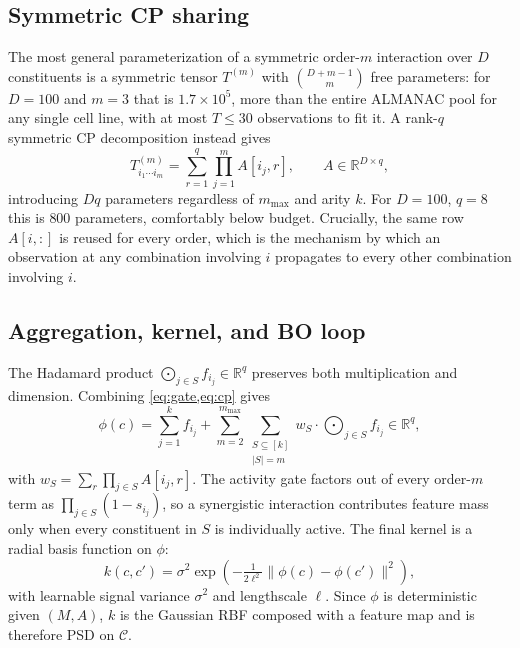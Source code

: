 \documentclass{article}
\begin{document}
\subsection{Symmetric CP sharing}

The most general parameterization of a symmetric order-$m$ interaction over
$D$ constituents is a symmetric tensor $T^{(m)}$ with
$\binom{D+m-1}{m}$ free parameters: for $D = 100$ and $m = 3$ that is
$1.7 \times 10^5$, more than the entire ALMANAC pool for any single cell
line, with at most $T \le 30$ observations to fit it. A rank-$q$ symmetric CP
decomposition instead gives
\begin{equation}
T^{(m)}_{i_1 \cdots i_m} = \sum_{r=1}^{q} \prod_{j=1}^{m} A[i_j, r],
\qquad A \in \mathbb{R}^{D \times q},
\label{eq:cp}
\end{equation}
introducing $Dq$ parameters regardless of $m_{\max}$ and arity $k$. For
$D = 100$, $q = 8$ this is $800$ parameters, comfortably below budget.
Crucially, the same row $A[i,:]$ is reused for every order, which is the
mechanism by which an observation at any combination involving $i$ propagates
to every other combination involving $i$.

\subsection{Aggregation, kernel, and BO loop}

The Hadamard product $\bigodot_{j \in S} f_{i_j} \in \mathbb{R}^q$ preserves
both multiplication and dimension. Combining \cref{eq:gate,eq:cp} gives
\begin{equation}
\phi(c) = \sum_{j=1}^{k} f_{i_j}
 + \sum_{m=2}^{m_{\max}} \sum_{\substack{S \subseteq [k] \\ |S| = m}}
 w_S \cdot \bigodot_{j \in S} f_{i_j} \in \mathbb{R}^q ,
\end{equation}
with $w_S = \sum_r \prod_{j \in S} A[i_j, r]$. The activity gate factors out
of every order-$m$ term as $\prod_{j \in S}(1 - s_{i_j})$, so a synergistic
interaction contributes feature mass only when every constituent in $S$ is
individually active. The final kernel is a radial basis function on $\phi$:
\begin{equation}
k(c, c') = \sigma^2 \exp\!\left(-\tfrac{1}{2\ell^2}\|\phi(c) - \phi(c')\|^2\right),
\label{eq:rbf}
\end{equation}
with learnable signal variance $\sigma^2$ and lengthscale $\ell$. Since
$\phi$ is deterministic given $(M, A)$, $k$ is the Gaussian RBF composed with
a feature map and is therefore PSD on $\mathcal{C}$.
\end{document}
